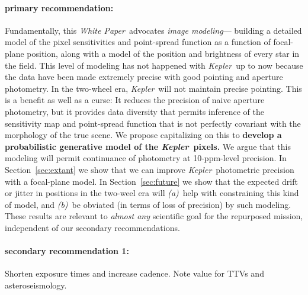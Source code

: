 \documentclass[12pt]{article}
\newcommand{\sectionname}{Section}
\newcommand{\documentname}{\textsl{White Paper}}
\newcommand{\observatory}[1]{\textsl{#1}}
\newcommand{\kepler}{\observatory{Kepler}}
\newcommand{\Kepler}{\kepler}
\begin{document}
\paragraph{primary recommendation:}
Fundamentally, this \documentname\ advocates \emph{image modeling}---%
  building a detailed model of the pixel sensitivities and point-spread function
  as a function of focal-plane position,
  along with a model of the position and brightness of every star in the field.
This level of modeling has not happened with \Kepler\ up to now
  because the data have been made extremely precise with good pointing
  and aperture photometry.
In the two-wheel era, \Kepler\ will not maintain precise pointing.
This is a benefit as well as a curse:
It reduces the precision of naive aperture photometry,
  but it provides data diversity that permits inference
  of the sensitivity map and point-spread function
  that is not perfectly covariant with the morphology of the true scene.
We propose capitalizing on this to
  \textbf{develop a probabilistic generative model of the \Kepler\ pixels.}
We argue that this modeling will permit continuance of photometry at 10-ppm-level precision.
In \sectionname~\ref{sec:extant} we show that we can improve \Kepler\ photometric precision with a focal-plane model.
In \sectionname~\ref{sec:future} we show that the expected drift or jitter in positions in the two-weel era
  will \textsl{(a)}~help with constraining this kind of model,
  and \textsl{(b)}~be obviated (in terms of loss of precision) by such modeling.
These results are relevant to \emph{almost any} scientific goal for the repurposed mission,
  independent of our secondary recommendations.

\paragraph{secondary recommendation 1:}
Shorten exposure times and increase cadence.
Note value for TTVs and asteroseismology.
\end{document}
